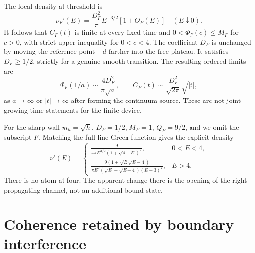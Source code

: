 \documentclass[aps,pra,reprint,superscriptaddress,longbibliography]{revtex4-2}
\begin{document}
The local density at threshold is
\begin{equation}
 \nu_F'(E)=\frac{D_F^2}{\pi}E^{-3/2}[1+O_F(E)]
                  \quad(E\downarrow0).                       \label{eq:threshold}
\end{equation}
It follows that $C_F(t)$ is finite at every fixed time and
$0<\Phi_F(c)\le M_F$ for $c>0$, with strict upper inequality for
$0<c<4$. The coefficient $D_F$ is
unchanged by moving the reference point $-d$ farther into the free
plateau. It satisfies $D_F\ge1/2$, strictly for a genuine smooth
transition. The resulting ordered limits are
\begin{equation}
 \Phi_F(1/a)\sim\frac{4D_F^2}{\pi\sqrt a},\qquad
 C_F(t)\sim\frac{D_F^2}{\sqrt{2\pi}}\sqrt{|t|},                 \label{eq:ordered}
\end{equation}
as $a\to\infty$ or $|t|\to\infty$ after forming the continuum source.
These are not joint growing-time statements for the finite device.

For the sharp wall $m_h=\sqrt h$, $D_F=1/2$, $M_F=1$, $Q_F=9/2$,
and we omit the subscript $F$. Matching the full-line Green function
gives the explicit density
\begin{equation}
 \nu'(E)=
 \begin{cases}
 \displaystyle\frac9{4\pi E^{3/2}(1+\sqrt{4-E})^2},&0<E<4,\\[5pt]
 \displaystyle\frac{9(1+\sqrt E\sqrt{E-4})}
 {\pi E^2(\sqrt E+\sqrt{E-4})(E-3)^2},&E>4.
 \end{cases}                                                   \label{eq:sharpdensity}
\end{equation}
There is no atom at four. The apparent change there is the opening of
the right propagating channel, not an additional bound state.

\section{Coherence retained by boundary interference}
\label{sec:herald}
\end{document}
